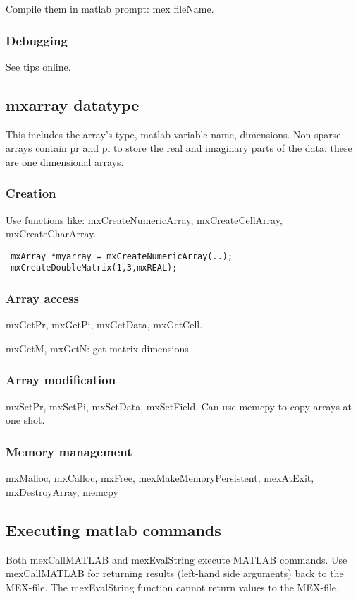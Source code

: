 \documentclass[oneside, article]{memoir}
\begin{document}
Compile them in matlab prompt: mex fileName.

\subsubsection{Debugging}
See tips online.

\subsection{mxarray datatype}
This includes the array's type, matlab variable name, dimensions. Non-sparse arrays contain pr and pi to store the real and imaginary parts of the data: these are one dimensional arrays.

\subsubsection{Creation}
Use functions like: mxCreateNumericArray, mxCreateCellArray, mxCreateCharArray.

\begin{verbatim}
 mxArray *myarray = mxCreateNumericArray(..);
 mxCreateDoubleMatrix(1,3,mxREAL);
\end{verbatim}

\subsubsection{Array access}
mxGetPr, mxGetPi, mxGetData, mxGetCell.

mxGetM, mxGetN: get matrix dimensions.

\subsubsection{Array modification}
mxSetPr, mxSetPi, mxSetData, mxSetField. Can use memcpy to copy arrays at one shot.

\subsubsection{Memory management}
mxMalloc, mxCalloc, mxFree, mexMakeMemoryPersistent, mexAtExit, mxDestroyArray, memcpy

\subsection{Executing matlab commands}
Both mexCallMATLAB and mexEvalString execute MATLAB commands. Use mexCallMATLAB for returning results (left-hand side arguments) back to the MEX-file. The mexEvalString function cannot return values to the MEX-file.
\end{document}

